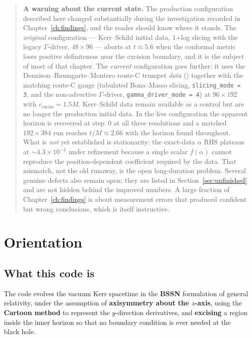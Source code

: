 \documentclass[11pt,openany]{book}
\begin{document}
\begin{quote}
\vspace{1em}
\noindent
\textbf{A warning about the current state.} The production configuration
described here changed substantially during the investigation recorded in
Chapter~\ref{ch:findings}, and the reader should know where it stands. The
\emph{original} configuration --- Kerr--Schild initial data, 1+log slicing
with the legacy $\Gamma$-driver, $48\times96$ --- aborts at $t\approx 5.6$
when the conformal metric loses positive definiteness near the excision
boundary, and it is the subject of most of that chapter. The \emph{current}
configuration goes further: it uses the Dennison--Baumgarte--Montero route-C
trumpet \emph{data} () together with the
matching route-C gauge (tabulated Bona--Masso slicing,
\texttt{slicing\_mode = 3}, and the non-advective $\Gamma$-driver,
\texttt{gamma\_driver\_mode = 4}) at $96\times192$ with
$r_{\mathrm{excise}} = 1.5M$. Kerr--Schild data remain available as a control
but are no longer the production initial data. In the live configuration the
apparent horizon is recovered at step~0 at all three resolutions and a matched
$192\times384$ run reaches $t/M \approx 2.66$ with the horizon found
throughout. What is \emph{not} yet established is stationarity: the exact-data
$\alpha$ RHS plateaus at $\sim4.3\times10^{-4}$ under refinement because a
single scalar $f(\alpha)$ cannot reproduce the position-dependent coefficient
required by the data. That mismatch, not the old runaway, is the open
long-duration problem. Several genuine defects also remain open; they are
listed in Section~\ref{sec:unfinished} and are not hidden behind the improved
numbers.
A large fraction of Chapter~\ref{ch:findings} is about measurement errors
that produced confident but wrong conclusions, which is itself instructive.
\end{quote}

\tableofcontents

\frontmatter
\mainmatter

\chapter{Orientation}
\label{ch:orientation}

\section{What this code is}

The code evolves the vacuum Kerr spacetime in the \textbf{BSSN} formulation of
general relativity, under the assumption of \textbf{axisymmetry about the
$z$-axis}, using the \textbf{Cartoon method} to represent the $y$-direction
derivatives, and \textbf{excising} a region inside the inner horizon so that no
boundary condition is ever needed at the black hole.
\end{document}
